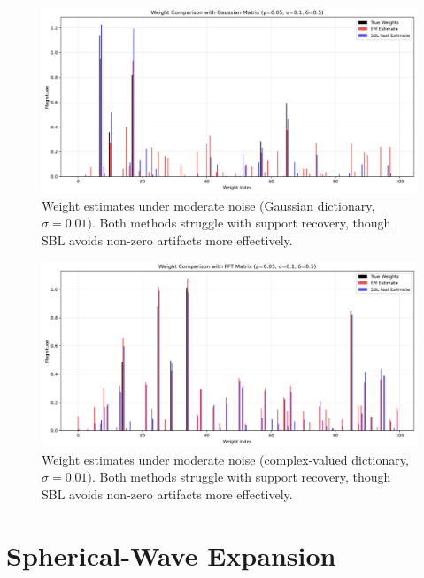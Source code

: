 \documentclass{article}
\begin{document}
\begin{figure}[H]
    \centering
    \includegraphics[width=0.75\linewidth]{Figures/weight_comparison_Gaussian_simga0.1.png}
    \caption{Weight estimates under moderate noise (Gaussian dictionary, $\sigma=0.01$). Both methods struggle with support recovery, though SBL avoids non-zero artifacts more effectively.}
    \label{fig:weight001Gauss}
\end{figure}
\begin{figure}[H]
    \centering
    \includegraphics[width=0.75\linewidth]{Figures/weight_comparison_FFT_simga0.1.png}
    \caption{Weight estimates under moderate noise (complex-valued dictionary, $\sigma=0.01$). Both methods struggle with support recovery, though SBL avoids non-zero artifacts more effectively.}
    \label{fig:weight001FFT}
\end{figure}

\section{Spherical-Wave Expansion}
\end{document}
